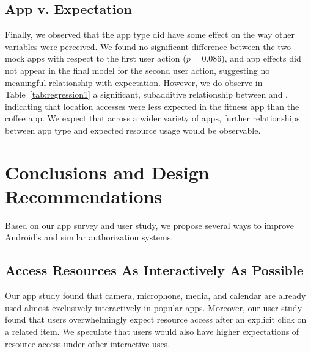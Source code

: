\subsection{App v. Expectation}
Finally, we observed that the app type did have some effect on the way other variables were perceived. 
We found no significant difference between the two mock apps with respect to the first user action ($p=0.086$), 
and app effects did not appear in the final model for the second user action, suggesting no meaningful 
relationship with expectation. However, we do observe in Table~\ref{tab:regression1} a significant, subadditive relationship 
between \textit{\fitness{}} and \textit{\location{}}, indicating that location accesses were less expected in the fitness app 
than the coffee app. We expect that across a wider variety of apps, further relationships between app type and expected resource usage would be observable. 

%

\section{Conclusions and Design Recommendations}

Based on our app survey and user study, we propose several ways
to improve Android's and similar authorization systems.

\subsection{Access Resources As Interactively As Possible}

Our app study found that camera, microphone, media, and calendar are
already used almost exclusively interactively
in popular apps. Moreover, our user study
found that users overwhelmingly expect resource access after an
explicit click on a related item. We speculate that users would also
have higher expectations of resource access under other interactive uses.

